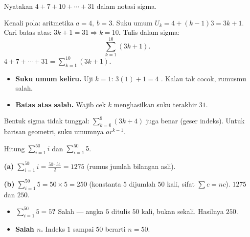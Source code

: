 \begin{soalbox}{}
Nyatakan $4+7+10+\cdots+31$ dalam notasi sigma.
\end{soalbox}

\jawab
{} Kenali pola: aritmetika $a=4,\ b=3$. Suku umum
$U_k=4+(k-1)3=3k+1$.
 Cari batas atas: $3k+1=31 \Rightarrow k=10$.
 Tulis dalam sigma:
\[
\sum_{k=1}^{10}(3k+1).
\]
\jadi $4+7+\cdots+31=\displaystyle\sum_{k=1}^{10}(3k+1)$.

\begin{jebakan}
\begin{itemize}[leftmargin=*,topsep=2pt]
  \item \textbf{Suku umum keliru.} Uji $k=1$: $3(1)+1=4$ \checkmark. Kalau tak
  cocok, rumusmu salah.
  \item \textbf{Batas atas salah.} Wajib cek $k$ menghasilkan suku terakhir $31$.
\end{itemize}
\end{jebakan}

\begin{variasi}
Bentuk sigma tidak tunggal: $\sum_{k=0}^{9}(3k+4)$ juga benar (geser indeks).
Untuk barisan geometri, suku umumnya $ar^{k-1}$.
\end{variasi}

\begin{soalbox}{}
Hitung $\displaystyle\sum_{i=1}^{50} i$ dan $\displaystyle\sum_{i=1}^{50}5$.
\end{soalbox}

\jawab
\textbf{(a)} $\displaystyle\sum_{i=1}^{50}i=\frac{50\cdot51}{2}=1275$
(rumus jumlah bilangan asli).

\textbf{(b)} $\displaystyle\sum_{i=1}^{50}5=50\times5=250$ (konstanta $5$
dijumlah $50$ kali, sifat $\sum c=nc$).
\jadi $1275$ dan $250$.

\begin{jebakan}
\begin{itemize}[leftmargin=*,topsep=2pt]
  \item \textbf{$\sum_{i=1}^{50}5=5$?} Salah --- angka $5$ ditulis $50$ kali,
  bukan sekali. Hasilnya $250$.
  \item \textbf{Salah $n$.} Indeks $1$ sampai $50$ berarti $n=50$.
\end{itemize}
\end{jebakan}


